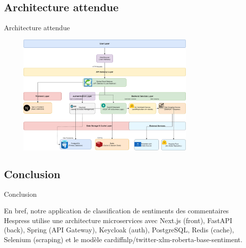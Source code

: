 \subsection{Architecture attendue}
\begin{frame}{Architecture attendue}
    \begin{figure}[H]
        \centering
        \includegraphics[height=6cm]{assets/images/arch.png}
    \end{figure}
\end{frame}

\subsection{Conclusion}
\begin{frame}{Conclusion}

    En bref, notre application de classification de sentiments des commentaires Hespress utilise une architecture microservices avec Next.js (front), FastAPI (back), Spring (API Gateway), Keycloak (auth), PostgreSQL, Redis (cache), Selenium (scraping) et le modèle cardiffnlp/twitter-xlm-roberta-base-sentiment.
\end{frame}
